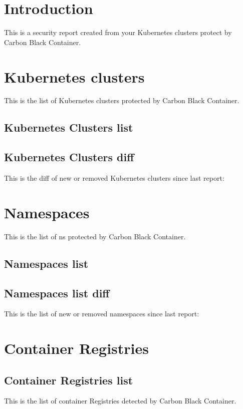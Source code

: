 \section{Introduction}

This is a security report created from your Kubernetes clusters protect by Carbon Black Container.

\section{Kubernetes clusters}

This is the list of Kubernetes clusters protected by Carbon Black Container.

\subsection{Kubernetes Clusters list}

\subsection{Kubernetes Clusters diff}
This is the diff of new or removed Kubernetes clusters since last report:
\vskip10pt


\section{Namespaces}

This is the list of \gls{ns} protected by Carbon Black Container.

\subsection{Namespaces list}

\subsection{Namespaces list diff}
This is the list of new or removed namespaces since last report:
\vskip10pt


\section{Container Registries}
\subsection{Container Registries list}
This is the list of container Registries detected by Carbon Black Container.
\vskip15pt

